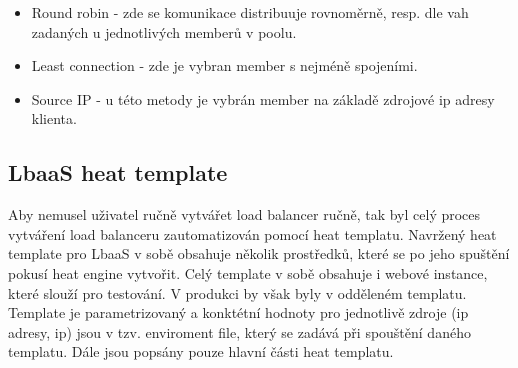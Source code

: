 \begin{itemize}
\item Round robin - zde se komunikace distribuuje rovnoměrně, resp. dle vah zadaných u jednotlivých memberů v poolu.
\item Least connection - zde je vybran member s nejméně spojeními.
\item Source IP - u této metody je vybrán member na základě zdrojové ip adresy klienta.
\end{itemize}

\subsection{LbaaS heat template}

Aby nemusel uživatel ručně vytvářet load balancer ručně, tak byl celý proces vytváření load balanceru zautomatizován pomocí heat templatu. Navržený heat template pro LbaaS v sobě obsahuje několik  prostředků, které se po jeho spuštění pokusí heat engine vytvořit. Celý template v sobě obsahuje i webové instance, které slouží pro testování. V produkci by však byly v odděleném templatu. Template je parametrizovaný a konktétní hodnoty pro jednotlivě zdroje (ip adresy, ip) jsou v tzv. enviroment file, který se zadává při spouštění daného templatu. Dále jsou popsány pouze hlavní části heat templatu.

